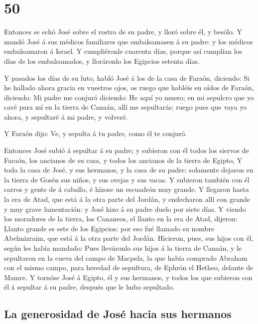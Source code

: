 \hypertarget{section-49}{%
\section{50}\label{section-49}}

 Entonces se echó José sobre el rostro de su padre, y lloró
sobre él, y besólo.  Y mandó José á sus médicos familiares
que embalsamasen á su padre: y los médicos embalsamaron á Israel.
 Y cumpliéronle cuarenta días, porque así cumplían los días
de los embalsamados, y lloráronlo los Egipcios setenta días.

 Y pasados los días de su luto, habló José á los de la casa
de Faraón, diciendo: Si he hallado ahora gracia en vuestros ojos, os
ruego que habléis en oídos de Faraón, diciendo:  Mi padre me
conjuró diciendo: He aquí yo muero; en mi sepulcro que yo cavé para mí
en la tierra de Canaán, allí me sepultarás; ruego pues que vaya yo
ahora, y sepultaré á mi padre, y volveré.

 Y Faraón dijo: Ve, y sepulta á tu padre, como él te
conjuró.

 Entonces José subió á sepultar á su padre; y subieron con
él todos los siervos de Faraón, los ancianos de su casa, y todos los
ancianos de la tierra de Egipto,  Y toda la casa de José, y
sus hermanos, y la casa de su padre: solamente dejaron en la tierra de
Gosén sus niños, y sus ovejas y sus vacas.  Y subieron
también con él carros y gente de á caballo, é hízose un escuadrón muy
grande.  Y llegaron hasta la era de Atad, que está á la
otra parte del Jordán, y endecharon allí con grande y muy grave
lamentación: y José hizo á su padre duelo por siete días. 
Y viendo los moradores de la tierra, los Cananeos, el llanto en la era
de Atad, dijeron: Llanto grande es este de los Egipcios: por eso fué
llamado su nombre Abelmizraim, que está á la otra parte del Jordán.
 Hicieron, pues, sus hijos con él, según les había mandado:
 Pues lleváronlo sus hijos á la tierra de Canaán, y le
sepultaron en la cueva del campo de Macpela, la que había comprado
Abraham con el mismo campo, para heredad de sepultura, de Ephrón el
Hetheo, delante de Mamre.  Y tornóse José á Egipto, él y
sus hermanos, y todos los que subieron con él á sepultar á su padre,
después que le hubo sepultado.

\hypertarget{la-generosidad-de-josuxe9-hacia-sus-hermanos}{%
\subsection{La generosidad de José hacia sus
hermanos}\label{la-generosidad-de-josuxe9-hacia-sus-hermanos}}

